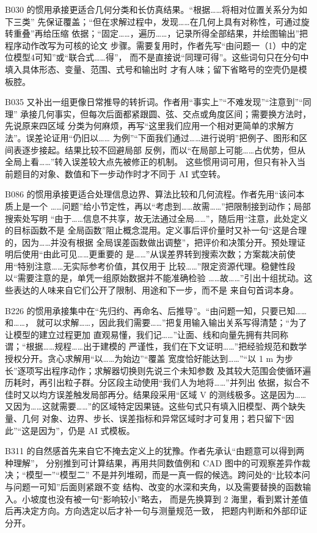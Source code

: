 B030 的惯用承接更适合几何分类和长仿真结果。“根据……将相对位置关系分为如下三类”
先保证覆盖；“但在求解过程中，发现……在几何上具有对称性，可通过旋转重叠”再给压缩
依据；“固定……，遍历……，记录所得全部结果，并绘图输出”把程序动作改写为可核的论文
步骤。需要复用时，作者先写“由问题一（1）中的定位模型4可知”或“联合式……得”，
而不是直接说“同理可得”。这些词句只在分句中填入具体形态、变量、范围、式号和输出时
才有人味；留下省略号的空壳仍是模板腔。

B035 又补出一组更像日常推导的转折词。作者用“事实上”“不难发现”“注意到”“同理”
承接几何事实，但每次后面都紧跟圆、弦、交点或角度区间；需要换方法时，先说原来四区域
分类为何麻烦，再写“这里我们应用一个相对更简单的求解方法”。误差论证用“仍旧以……
为例”“下面我们通过……进行说明”把例子、图形和区间表逐步接起。结果比较不回避局部
反例，而以“在局部上可能……占优势，但从全局上看……”转入误差较大点先被修正的机制。
这些惯用词可用，但只有补入当前题目的对象、数值和下一步动作时才不同于 AI 式空转。

B086 的惯用承接更适合处理信息边界、算法比较和几何流程。作者先用“该问本质上是一个
……问题”给小节定性，再以“考虑到……故需……”把限制接到动作；局部搜索处写明
“由于……信息不共享，故无法通过全局……”，随后用“注意，此处定义的目标函数不是
全局函数”阻止概念混用。定义事后评价量时又补一句“这是合理的，因为……并没有根据
全局误差函数做出调整”，把评价和决策分开。预处理证明后使用“由此可见……更重要的
是……”从误差界转到搜索次数；方案裁决前使用“特别注意……无实际参考价值，其仅用于
比较……”限定资源代理。稳健性段以“需要注意的是，单凭一组原始数据并不能准确检验
……故……”引出十组扰动。这些表达的人味来自它们公开了限制、用途和下一步，而不是
来自句首词本身。

B226 的惯用承接集中在“先归约、再命名、后推导”。“由问题一知，只要已知……和……，
就可以求解……，因此我们需要……”把复用输入输出关系写得清楚；“为了让模型的建立过程更加
直观易懂，我们记……”让面、线和向量先拥有共同称谓；“根据……规程……出于建模的
严谨性，我们在下文证明……”把经验规范和数学授权分开。贪心求解用“以……为始边”“覆盖
宽度恰好能达到……”“以 1 m 为步长”逐项写出程序动作；求解器切换则先说三个未知参数
及其较大范围会使循环遍历耗时，再引出粒子群。分区段主动使用“我们人为地将……”并列出
依据，拟合不佳时又以均方误差触发局部再分。结果段采用“区域 V 的测线极多。这是因为……
又因为……这就需要……”的区域特定因果链。这些句式只有填入旧模型、两个缺失量、几何
对象、边界、步长、误差指标和异常区域时才可复用；若只留下“因此”“这是因为”，仍是 AI
式模板。

B311 的自然感首先来自它不掩去定义上的犹豫。作者先承认“由题意可以得到两种理解”，
分别推到可计算结果，再用共同数值例和 CAD 图中的可观察差异作裁决；“模型一”“模型二”
不是并列堆砌，而是一真一假的候选。跨问处的“比较本问与问题一可知”后面则紧跟不变
结构、改变的水深和夹角，以及需要替换的函数输入。小坡度也没有被一句“影响较小”略去，
而是先换算到 2 海里，看到累计差值后再决定方向。方向选定以后才补一句与测量规范一致，
把题内判断和外部印证分开。

